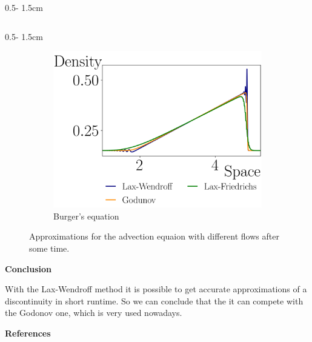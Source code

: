 \documentclass{uibposter}
\begin{document}
\begin{frame}[fragile]
\begin{columns}
\begin{column}{0.5\textwidth - 1.5cm}
\begin{column}{0.5\textwidth - 1.5cm}
\begin{figure}
	\begin{subfigure}{\textwidth}
		\includegraphics{fig/burger_compare.png}
		\caption{Burger's equation}
		\label{img:burger_comprehension}
	\end{subfigure}
	\caption{Approximations for the advection equaion with different flows after some time.}
\end{figure}

\textbf{Conclusion}

\vspace{0.5cm}
With the Lax-Wendroff method it is possible to get accurate approximations of a discontinuity in short runtime. So we can conclude that the it can compete with the Godonov one, which is very used nowadays.
    
    \textbf{\scriptsize{References}}
    \vspace{0.3cm}
    \nocite{*} 
    
    
    

\end{column}
\end{column}
\end{columns}





\end{frame}
\end{document}
